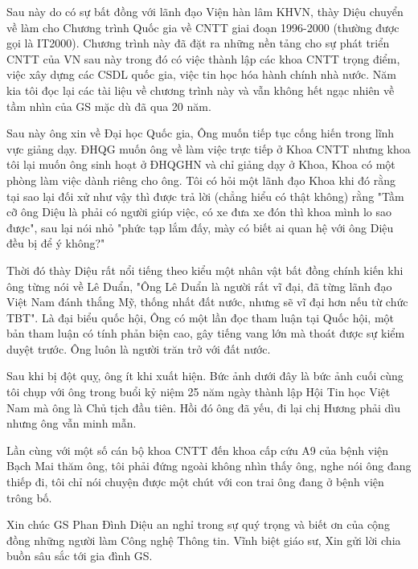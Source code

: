 Sau này do có sự bất đồng với lãnh đạo Viện hàn lâm KHVN, thày Diệu chuyển về làm cho Chương trình Quốc gia về CNTT giai đoạn 1996-2000 (thường được gọi là IT2000). Chương trình này đã đặt ra những nền tảng cho sự phát triển CNTT của VN sau này trong đó có việc thành lập các khoa CNTT trọng điểm, việc xây dựng các CSDL quốc gia, việc tin học hóa hành chính nhà nước. Năm kia tôi đọc lại các tài liệu về chương trình này và vẫn không hết ngạc nhiên về tầm nhìn của GS mặc dù đã qua 20 năm. 

Sau này ông xin về Đại học Quốc gia, Ông muốn tiếp tục cống hiến trong lĩnh vực giảng dạy. ĐHQG muốn ông về làm việc trực tiếp ở Khoa CNTT nhưng khoa tôi lại muốn ông sinh hoạt ở ĐHQGHN và chỉ giảng dạy ở Khoa, Khoa có một phòng làm việc dành riêng cho ông. Tôi có hỏi một lãnh đạo Khoa khi đó rằng tại sao lại đối xử như vậy thì được trả lời (chẳng hiểu có thật không) rằng "Tầm cỡ ông Diệu là phải có người giúp việc, có xe đưa xe đón thì khoa mình lo sao được", sau lại nói nhỏ  "phức tạp lắm đấy, mày có biết ai quan hệ với ông Diệu đều bị để ý không?"

Thời đó thày Diệu rất nổi tiếng theo kiểu một nhân vật bất đồng chính kiến khi ông từng nói về Lê Duẩn, "Ông Lê Duẩn là người rất vĩ đại, đã từng lãnh đạo Việt Nam đánh thắng Mỹ, thống nhất đất nước, nhưng sẽ vĩ đại hơn nếu từ chức TBT". Là đại biểu quốc hội, Ông có một lần đọc tham luận tại Quốc hội, một bản tham luận có tính phản biện cao, gây tiếng vang lớn mà thoát được sự kiểm duyệt trước. Ông luôn là người trăn trở với đất nước.

Sau khi bị đột quỵ, ông ít khi xuất hiện. Bức ảnh dưới đây là bức ảnh cuối cùng tôi chụp với ông trong buổi kỷ niệm 25 năm ngày thành lập Hội Tin học Việt Nam mà ông là Chủ tịch đầu tiên. Hồi đó ông đã yếu, đi lại chị Hương  phải dìu nhưng ông vẫn minh mẫn. 

Lần cùng với một số cán bộ khoa CNTT đến khoa cấp cứu A9 của bệnh viện Bạch Mai thăm ông, tôi phải đứng ngoài không nhìn thấy ông, nghe nói ông đang thiếp đi, tôi chỉ nói chuyện được một chút với con trai ông đang ở bệnh viện trông bố.

Xin chúc GS Phan Đình Diệu an nghỉ trong sự quý trọng và biết ơn của cộng đồng những người làm Công nghệ Thông tin. 
Vĩnh biệt giáo sư, 
Xin gửi lời chia buồn sâu sắc tới gia đình GS.